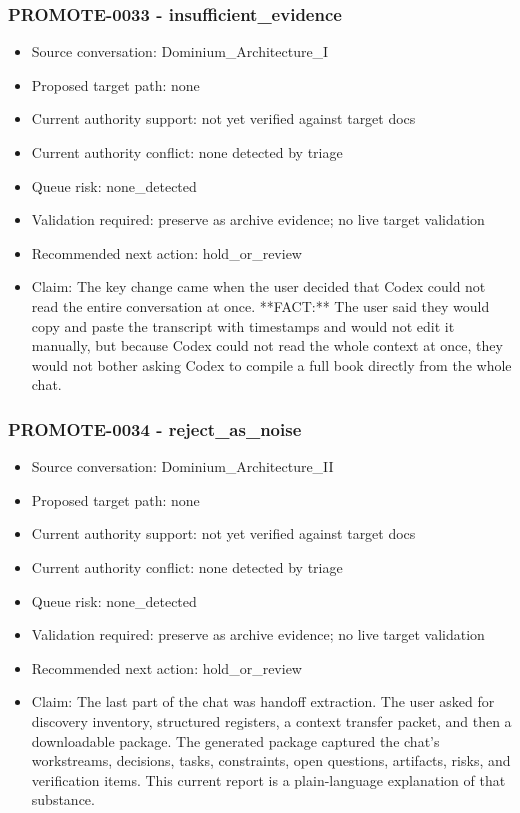 \documentclass[11pt,a4paper]{report}
\begin{document}
\subsubsection{PROMOTE-0033 - insufficient\_evidence}

\begin{itemize}
\item Source conversation: Dominium\_Architecture\_I
\item Proposed target path: none
\item Current authority support: not yet verified against target docs
\item Current authority conflict: none detected by triage
\item Queue risk: none\_detected
\item Validation required: preserve as archive evidence; no live target validation
\item Recommended next action: hold\_or\_review
\item Claim: The key change came when the user decided that Codex could not read the entire conversation at once. **FACT:** The user said they would copy and paste the transcript with timestamps and would not edit it manually, but because Codex could not read the whole context at once, they would not bother asking Codex to compile a full book directly from the whole chat.
\end{itemize}

\subsubsection{PROMOTE-0034 - reject\_as\_noise}

\begin{itemize}
\item Source conversation: Dominium\_Architecture\_II
\item Proposed target path: none
\item Current authority support: not yet verified against target docs
\item Current authority conflict: none detected by triage
\item Queue risk: none\_detected
\item Validation required: preserve as archive evidence; no live target validation
\item Recommended next action: hold\_or\_review
\item Claim: The last part of the chat was handoff extraction. The user asked for discovery inventory, structured registers, a context transfer packet, and then a downloadable package. The generated package captured the chat's workstreams, decisions, tasks, constraints, open questions, artifacts, risks, and verification items. This current report is a plain-language explanation of that substance.
\end{itemize}
\end{document}

